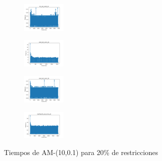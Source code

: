 \begin{figure}[H]
\begin{subfigure}
    \end{subfigure}
    \hfill
    \begin{subfigure}
        \centering
        \includegraphics[width=0.234\textwidth]{img/am01/iris_set_const_20_3773969821_time.png}
    \end{subfigure}
    \hfill
    \begin{subfigure}
        \centering
        \includegraphics[width=0.234\textwidth]{img/am01/ecoli_set_const_20_3773969821_time.png}
    \end{subfigure}
    \hfill
    \begin{subfigure}
        \centering
        \includegraphics[width=0.234\textwidth]{img/am01/rand_set_const_20_3773969821_time.png}
    \end{subfigure}
    \hfill
    \begin{subfigure}
        \centering
        \includegraphics[width=0.234\textwidth]{img/am01/newthyroid_set_const_20_3773969821_time.png}
    \end{subfigure}
    \caption{Tiempos de AM-(10,0.1) para 20\% de restricciones}
\end{figure}

\vspace*{\fill}
\newpage
\vspace*{\fill}

